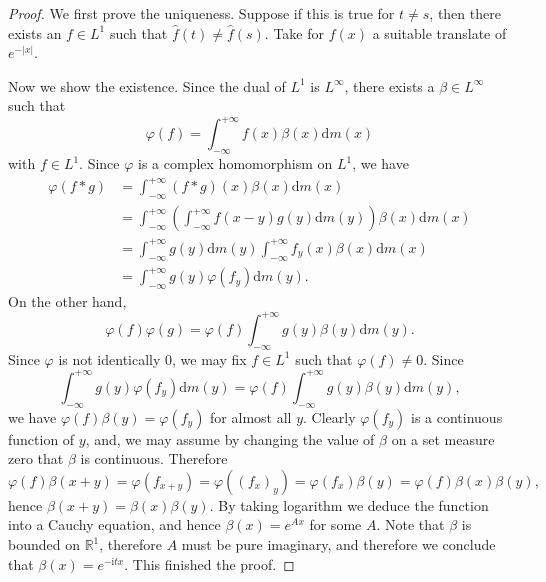 \begin{proof}
We first prove the uniqueness. Suppose if this is true for $t\ne s$, then there exists an $f\in L^1$ such that $\widehat{f}(t)\ne\widehat{f}(s)$. Take for $f(x)$ a suitable translate of $e^{-|x|}$.\par
Now we show the existence. Since the dual of $L^1$ is $L^\infty$, there exists a $\beta\in L^\infty$ such that 
$$
\varphi \left( f \right) =\int_{-\infty}^{+\infty}{f\left( x \right) \beta \left( x \right) \mathrm{d}m\left( x \right)}
$$
with $f\in L^1$. Since $\varphi$ is a complex homomorphism on $L^1$, we have 
$$
\begin{aligned}
\varphi \left( f*g \right) &=\int_{-\infty}^{+\infty}{\left( f*g \right) \left( x \right) \beta \left( x \right) \mathrm{d}m\left( x \right)}
\\
&=\int_{-\infty}^{+\infty}{\left( \int_{-\infty}^{+\infty}{f\left( x-y \right) g\left( y \right) \mathrm{d}m\left( y \right)} \right) \beta \left( x \right) \mathrm{d}m\left( x \right)}
\\
&=\int_{-\infty}^{+\infty}{g\left( y \right) \mathrm{d}m\left( y \right) \int_{-\infty}^{+\infty}{f_y\left( x \right) \beta \left( x \right) \mathrm{d}m\left( x \right)}}
\\
&=\int_{-\infty}^{+\infty}{g\left( y \right) \varphi \left( f_y \right) \mathrm{d}m\left( y \right)}.
\end{aligned}
$$
On the other hand, 
$$
\varphi \left( f \right) \varphi \left( g \right) =\varphi \left( f \right) \int_{-\infty}^{+\infty}{g\left( y \right) \beta \left( y \right) \mathrm{d}m\left( y \right)}.
$$
Since $\varphi$ is not identically $0$, we may fix $f\in L^1$ such that $\varphi(f)\ne 0$. Since 
$$
\int_{-\infty}^{+\infty}{g\left( y \right) \varphi \left( f_y \right) \mathrm{d}m\left( y \right)}=\varphi \left( f \right) \int_{-\infty}^{+\infty}{g\left( y \right) \beta \left( y \right) \mathrm{d}m\left( y \right)},
$$
we have $\varphi(f)\beta(y)=\varphi(f_y)$ for almost all $y$. Clearly $\varphi(f_y)$ is a continuous function of $y$, and, we may assume by changing the value of $\beta$ on a set measure zero that $\beta$ is continuous. Therefore 
$$
\varphi \left( f \right) \beta \left( x+y \right) =\varphi \left( f_{x+y} \right) =\varphi \left( \left( f_x \right) _y \right) =\varphi \left( f_x \right) \beta \left( y \right) =\varphi \left( f \right) \beta \left( x \right) \beta \left( y \right) ,
$$
hence $\beta(x+y)=\beta(x)\beta(y)$. By taking logarithm we deduce the function into a Cauchy equation, and hence $\beta(x)=e^{Ax}$ for some $A$. Note that $\beta$ is bounded on $\mathbb{R}^1$, therefore $A$ must be pure imaginary, and therefore we conclude that $\beta(x)=e^{-\mathrm{i}tx}$. This finished the proof.
\end{proof}
